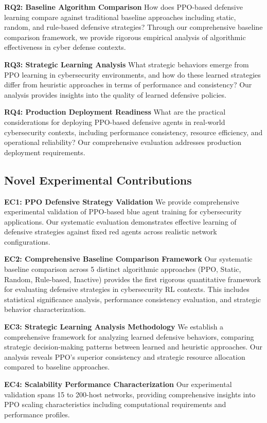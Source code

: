 \documentclass[12pt,twoside]{article}
\theoremstyle{definition}
\theoremstyle{plain}
\begin{document}
\textbf{RQ2: Baseline Algorithm Comparison}
How does PPO-based defensive learning compare against traditional baseline approaches including static, random, and rule-based defensive strategies? Through our comprehensive baseline comparison framework, we provide rigorous empirical analysis of algorithmic effectiveness in cyber defense contexts.

\textbf{RQ3: Strategic Learning Analysis}
What strategic behaviors emerge from PPO learning in cybersecurity environments, and how do these learned strategies differ from heuristic approaches in terms of performance and consistency? Our analysis provides insights into the quality of learned defensive policies.

\textbf{RQ4: Production Deployment Readiness}
What are the practical considerations for deploying PPO-based defensive agents in real-world cybersecurity contexts, including performance consistency, resource efficiency, and operational reliability? Our comprehensive evaluation addresses production deployment requirements.

\subsection{Novel Experimental Contributions}

\textbf{EC1: PPO Defensive Strategy Validation}
We provide comprehensive experimental validation of PPO-based blue agent training for cybersecurity applications. Our systematic evaluation demonstrates effective learning of defensive strategies against fixed red agents across realistic network configurations.

\textbf{EC2: Comprehensive Baseline Comparison Framework}
Our systematic baseline comparison across 5 distinct algorithmic approaches (PPO, Static, Random, Rule-based, Inactive) provides the first rigorous quantitative framework for evaluating defensive strategies in cybersecurity RL contexts. This includes statistical significance analysis, performance consistency evaluation, and strategic behavior characterization.

\textbf{EC3: Strategic Learning Analysis Methodology}
We establish a comprehensive framework for analyzing learned defensive behaviors, comparing strategic decision-making patterns between learned and heuristic approaches. Our analysis reveals PPO's superior consistency and strategic resource allocation compared to baseline approaches.

\textbf{EC4: Scalability Performance Characterization}
Our experimental validation spans 15 to 200-host networks, providing comprehensive insights into PPO scaling characteristics including computational requirements and performance profiles.
\end{document}
